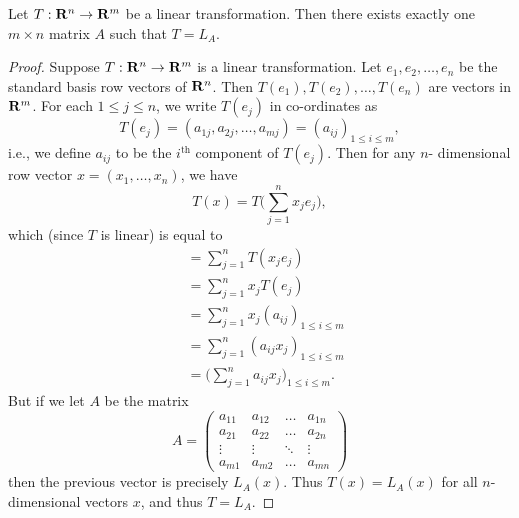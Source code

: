 \setcounter{theorem}{12}
\begin{lemma}\label{6.1.13}
  Let \(T : \mathbf{R}^n \to \mathbf{R}^m\) be a linear transformation.
  Then there exists exactly one \(m \times n\) matrix \(A\) such that \(T = L_A\).
\end{lemma}

\begin{proof}
  Suppose \(T : \mathbf{R}^n \to \mathbf{R}^m\) is a linear transformation.
  Let \(e_1, e_2, \dots, e_n\) be the standard basis row vectors of \(\mathbf{R}^n\).
  Then \(T(e_1), T(e_2), \dots, T(e_n)\) are vectors in \(\mathbf{R}^m\).
  For each \(1 \leq j \leq n\), we write \(T(e_j)\) in co-ordinates as
  \[
    T(e_j) = (a_{1j}, a_{2j}, \dots, a_{mj}) = (a_{ij})_{1 \leq i \leq m},
  \]
  i.e., we define \(a_{ij}\) to be the \(i^{\text{th}}\) component of \(T(e_j)\).
  Then for any \(n\)- dimensional row vector \(x = (x_1, \dots, x_n)\), we have
  \[
    T(x) = T\bigg(\sum_{j = 1}^n x_j e_j\bigg),
  \]
  which (since \(T\) is linear) is equal to
  \begin{align*}
     & = \sum_{j = 1}^n T(x_j e_j)                                \\
     & = \sum_{j = 1}^n x_j T(e_j)                                \\
     & = \sum_{j = 1}^n x_j (a_{ij})_{1 \leq i \leq m}            \\
     & = \sum_{j = 1}^n (a_{ij} x_j)_{1 \leq i \leq m}            \\
     & = \bigg(\sum_{j = 1}^n a_{ij} x_j\bigg)_{1 \leq i \leq m}.
  \end{align*}
  But if we let \(A\) be the matrix
  \[
    A = \begin{pmatrix}
      a_{11} & a_{12} & \dots  & a_{1n} \\
      a_{21} & a_{22} & \dots  & a_{2n} \\
      \vdots & \vdots & \ddots & \vdots \\
      a_{m1} & a_{m2} & \dots  & a_{mn}
    \end{pmatrix}
  \]
  then the previous vector is precisely \(L_A(x)\).
  Thus \(T(x) = L_A(x)\) for all \(n\)-dimensional vectors \(x\), and thus \(T = L_A\).


\end{proof}
